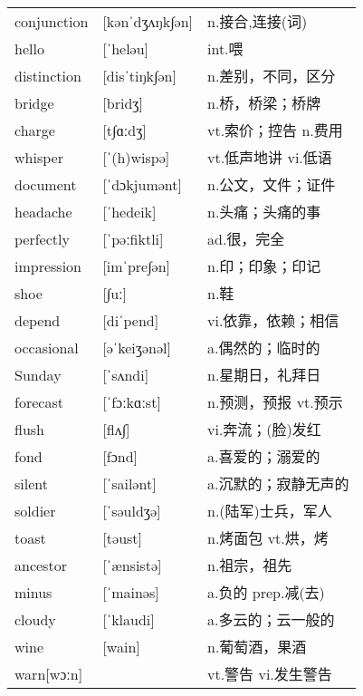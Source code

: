\documentclass[a4paper]{article}
\begin{document}
\section{}
\begin{tabular}{l l l}

conjunction & [kənˈdʒʌŋk∫ən] & n.接合,连接(词) \\
hello & [ˈheləu] & int.喂 \\
distinction & [disˈtiŋk∫ən] & n.差别，不同，区分 \\
bridge & [bridʒ] & n.桥，桥梁；桥牌 \\
charge & [t∫ɑːdʒ] & vt.索价；控告 n.费用 \\
whisper & [ˈ(h)wispə] & vt.低声地讲 vi.低语 \\
document & [ˈdɔkjumənt] & n.公文，文件；证件 \\
headache & [ˈhedeik] & n.头痛；头痛的事 \\
perfectly & [ˈpəːfiktli] & ad.很，完全 \\
impression & [imˈpre∫ən] & n.印；印象；印记 \\
shoe & [∫uː] & n.鞋 \\
depend & [diˈpend] & vi.依靠，依赖；相信 \\
occasional & [əˈkeiʒənəl] & a.偶然的；临时的 \\
Sunday & [ˈsʌndi] & n.星期日，礼拜日 \\
forecast & [ˈfɔːkɑːst] & n.预测，预报 vt.预示 \\
flush & [flʌ∫] & vi.奔流；(脸)发红 \\
fond & [fɔnd] & a.喜爱的；溺爱的 \\
silent & [ˈsailənt] & a.沉默的；寂静无声的 \\
soldier & [ˈsəuldʒə] & n.(陆军)士兵，军人 \\
toast & [təust] & n.烤面包 vt.烘，烤 \\
ancestor & [ˈænsistə] & n.祖宗，祖先 \\
minus & [ˈmainəs] & a.负的 prep.减(去) \\
cloudy & [ˈklaudi] & a.多云的；云一般的 \\
wine & [wain] & n.葡萄酒，果酒 \\
warn[wɔːn] &  & vt.警告 vi.发生警告 \\

\end{tabular}
\end{document}
